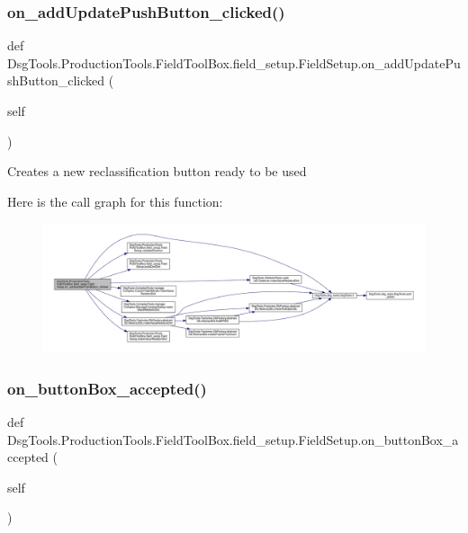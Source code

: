 \subsubsection{\texorpdfstring{on\+\_\+add\+Update\+Push\+Button\+\_\+clicked()}{on\_addUpdatePushButton\_clicked()}}
{\footnotesize\ttfamily def Dsg\+Tools.\+Production\+Tools.\+Field\+Tool\+Box.\+field\+\_\+setup.\+Field\+Setup.\+on\+\_\+add\+Update\+Push\+Button\+\_\+clicked (\begin{DoxyParamCaption}\item[{}]{self }\end{DoxyParamCaption})}

\begin{DoxyVerb}Creates a new reclassification button ready to be used
\end{DoxyVerb}
 Here is the call graph for this function\+:
\nopagebreak
\begin{figure}[H]
\begin{center}
\leavevmode
\includegraphics[width=350pt]{class_dsg_tools_1_1_production_tools_1_1_field_tool_box_1_1field__setup_1_1_field_setup_a389626265ae4295fc97b5ad27cabe6f4_cgraph}
\end{center}
\end{figure}
\mbox{\label{class_dsg_tools_1_1_production_tools_1_1_field_tool_box_1_1field__setup_1_1_field_setup_a38663e31c6b8f356361f104d8819d755}} 
\subsubsection{\texorpdfstring{on\+\_\+button\+Box\+\_\+accepted()}{on\_buttonBox\_accepted()}}
{\footnotesize\ttfamily def Dsg\+Tools.\+Production\+Tools.\+Field\+Tool\+Box.\+field\+\_\+setup.\+Field\+Setup.\+on\+\_\+button\+Box\+\_\+accepted (\begin{DoxyParamCaption}\item[{}]{self }\end{DoxyParamCaption})}

